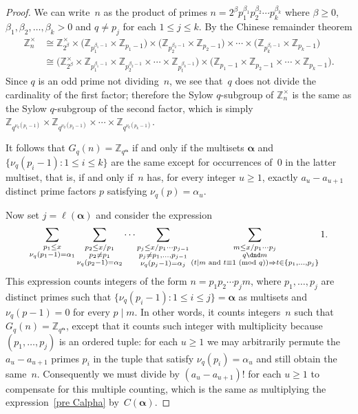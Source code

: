 \documentclass[12pt,reqno]{amsart}
\theoremstyle{definition}
\newcommand{\Z}{{\mathbb Z}}
\newcommand{\balpha}{{\bm\alpha}}
\renewcommand{\mod}[1]{{\ifmmode\text{\rm\ (mod~$#1$)}\else\discretionary{}{}{\hbox{ }}\rm(mod~$#1$)\fi}}
\begin{document}
\begin{proof}
We can write~$n$ as the product of primes $n=2^{\beta}p_1^{\beta_1}p_2^{\beta_2}\cdots p_k^{\beta_k}$ where $\beta\ge 0$, $\beta_1,\beta_2,\ldots,\beta_k>0$ and $q\ne p_j$ for each $1\le j\le k$. By the Chinese remainder theorem
\begin{align*}
\Z_n^\times &\cong \Z_{2^\beta}^\times\times \big( \Z_{p_1^{\beta_1-1}}\times\Z_{p_1-1} \big) \times \big( \Z_{p_2^{\beta_2-1}}\times\Z_{p_2-1} \big) \times\cdots\times \big( \Z_{p_k^{\beta_t-1}}\times\Z_{p_k-1} \big) \\
&\cong \big( \Z_{2^\beta}^\times \times \Z_{p_1^{\beta_1-1}} \times \Z_{p_2^{\beta_2-1}} \times\cdots\times \Z_{p_t^{\beta_k-1}} \big) \times \big( \Z_{p_1-1} \times \Z_{p_2-1} \times\cdots\times \Z_{p_k-1} \big).
\end{align*}
Since $q$ is an odd prime not dividing~$n$, we see that~$q$ does not divide the cardinality of the first factor; therefore the Sylow $q$-subgroup of $\Z_n^\times$ is the same as the Sylow $q$-subgroup of the second factor, which is simply $\Z_{q^{\nu_q(p_1-1)}} \times \Z_{q^{\nu_q(p_2-1)}} \times\cdots\times \Z_{q^{\nu_q(p_k-1)}}$.

It follows that $G_q(n)=\Z_{q^\balpha}$ if and only if the multisets $\balpha$ and $\{\nu_q(p_i-1)\colon 1\le i\le k\}$ are the same except for occurrences of~$0$ in the latter multiset, that is, if and only if~$n$ has, for every integer $u\ge1$, exactly $a_u-a_{u+1}$ distinct prime factors $p$ satisfying $\nu_q(p)=\alpha_u$.

Now set $j=\ell(\balpha)$ and consider the expression
\begin{equation} \label{pre Calpha}
\sum_{\substack{p_1\le x\\\nu_q(p_1-1)=\alpha_1}}\sum_{\substack{p_2\le x/p_1\\p_2\ne p_1\\\nu_q(p_2-1)=\alpha_2}}\cdots \sum_{\substack{p_j\le x/p_1\cdots p_{j-1}\\p_j\ne p_1,\ldots,p_{j-1}\\\nu_q(p_j-1)=\alpha_j}}\sum_{\substack{m\le x/p_1\cdots p_j\\q\dnd m\\ (t\mid m \text{ and }t\equiv1\mod q)\Rightarrow t\in\{p_1,\dots,p_j\}}}1.
\end{equation}
This expression counts integers of the form $n=p_1p_2\cdots p_jm$, where $p_1,\ldots,p_j$ are distinct primes such that $\{\nu_q(p_i-1)\colon 1\le i\le j\} = \balpha$ as multisets and $\nu_q(p-1)=0$ for every $p\mid m$. In other words, it counts integers~$n$ such that $G_q(n)=\Z_{q^\balpha}$, except that it counts such integer with multiplicity because $(p_1,\dots,p_j)$ is an ordered tuple: for each $u\ge1$ we may arbitrarily permute the $a_u-a_{u+1}$ primes $p_i$ in the tuple that satisfy $\nu_q(p_i)=\alpha_u$ and still obtain the same~$n$. Consequently we must divide by $(a_u-a_{u+1})!$ for each $u\ge1$ to compensate for this multiple counting, which is the same as multiplying the expression~\eqref{pre Calpha} by~$C(\balpha)$.


\end{proof}
\end{document}
